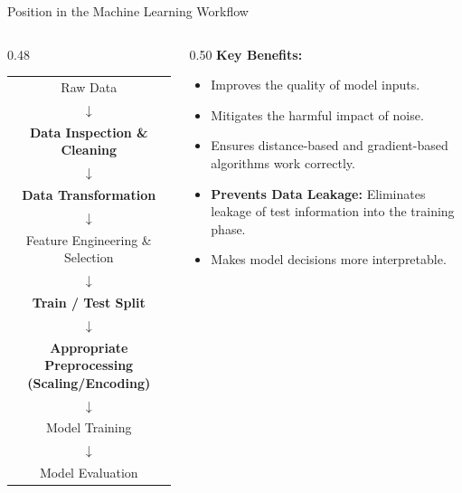 \documentclass[aspectratio=169,11pt]{beamer}
\begin{document}
\begin{frame}{Position in the Machine Learning Workflow}
\begin{columns}[T]
\begin{column}{0.48\textwidth}
\begin{center}
\scriptsize
\renewcommand{\arraystretch}{0.82}
\begin{tabular}{c}
Raw Data \\
$\downarrow$ \\
\textbf{Data Inspection \& Cleaning} \\
$\downarrow$ \\
\textbf{Data Transformation} \\
$\downarrow$ \\
Feature Engineering \& Selection \\
$\downarrow$ \\
\textbf{Train / Test Split} \\
$\downarrow$ \\
\textbf{Appropriate Preprocessing (Scaling/Encoding)} \\
$\downarrow$ \\
Model Training \\
$\downarrow$ \\
Model Evaluation
\end{tabular}
\end{center}
\end{column}
\begin{column}{0.50\textwidth}
\textbf{Key Benefits:}
\begin{itemize}
  \item Improves the quality of model inputs.
  \item Mitigates the harmful impact of noise.
  \item Ensures distance-based and gradient-based algorithms work correctly.
  \item \textbf{Prevents Data Leakage:} Eliminates leakage of test information into the training phase.
  \item Makes model decisions more interpretable.
\end{itemize}
\end{column}
\end{columns}
\end{frame}
\end{document}
